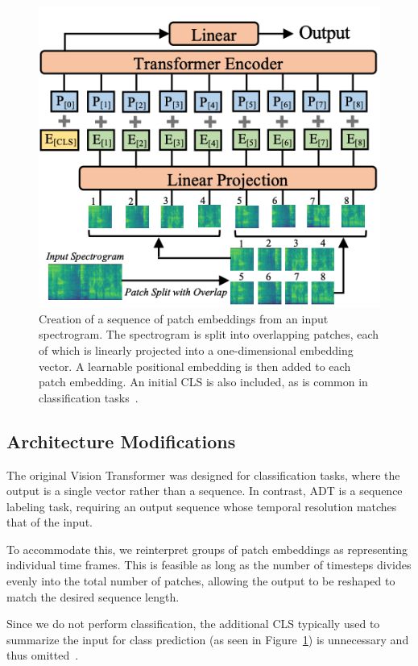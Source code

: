 \begin{figure}[H]
    \centering
    \includegraphics[trim=0 0 0 116, clip, scale=0.7]{figures/patchembedding.png}
    \caption{Creation of a sequence of patch embeddings from an input spectrogram. The spectrogram is split into overlapping patches, each of which is linearly projected into a one-dimensional embedding vector. A learnable positional embedding is then added to each patch embedding. An initial \acrfull{CLS} is also included, as is common in classification tasks~\cite{gong2021astaudiospectrogramtransformer}.}
    \label{PatchEmbeddingFigure}
\end{figure}

\subsection{Architecture Modifications}

The original Vision Transformer was designed for classification tasks, where the output is a single vector rather than a sequence. In contrast, \gls{ADT} is a sequence labeling task, requiring an output sequence whose temporal resolution matches that of the input.

To accommodate this, we reinterpret groups of patch embeddings as representing individual time frames. This is feasible as long as the number of timesteps divides evenly into the total number of patches, allowing the output to be reshaped to match the desired sequence length.

Since we do not perform classification, the additional \gls{CLS} typically used to summarize the input for class prediction (as seen in Figure~\ref{PatchEmbeddingFigure}) is unnecessary and thus omitted~\cite{dosovitskiy2021imageworth16x16words}.

